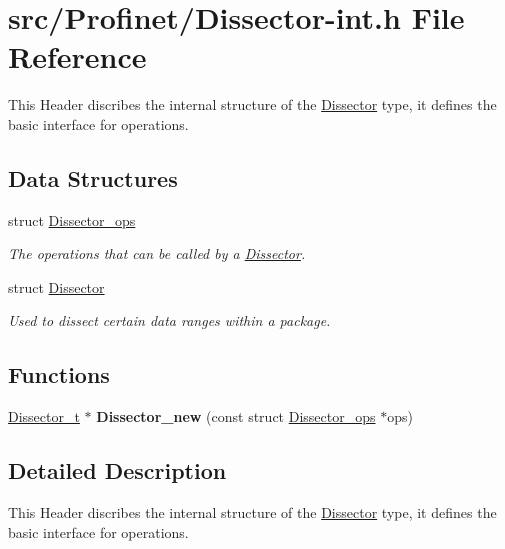 \hypertarget{_dissector-int_8h}{\section{src/\-Profinet/\-Dissector-\/int.h File Reference}
\label{_dissector-int_8h}
}


This Header discribes the internal structure of the \hyperlink{struct_dissector}{Dissector} type, it defines the basic interface for operations.  


\subsection*{Data Structures}
\begin{DoxyCompactItemize}
\item 
struct \hyperlink{struct_dissector__ops}{Dissector\-\_\-ops}
\begin{DoxyCompactList}\small\item\em The operations that can be called by a \hyperlink{struct_dissector}{Dissector}. \end{DoxyCompactList}\item 
struct \hyperlink{struct_dissector}{Dissector}
\begin{DoxyCompactList}\small\item\em Used to dissect certain data ranges within a package. \end{DoxyCompactList}\end{DoxyCompactItemize}
\subsection*{Functions}
\begin{DoxyCompactItemize}
\item 
\hypertarget{_dissector-int_8h_af20c51477bd3b35a08e9558f011367ae}{\hyperlink{struct_dissector}{Dissector\-\_\-t} $\ast$ {\bfseries Dissector\-\_\-new} (const struct \hyperlink{struct_dissector__ops}{Dissector\-\_\-ops} $\ast$ops)}\label{_dissector-int_8h_af20c51477bd3b35a08e9558f011367ae}

\end{DoxyCompactItemize}


\subsection{Detailed Description}
This Header discribes the internal structure of the \hyperlink{struct_dissector}{Dissector} type, it defines the basic interface for operations. 
